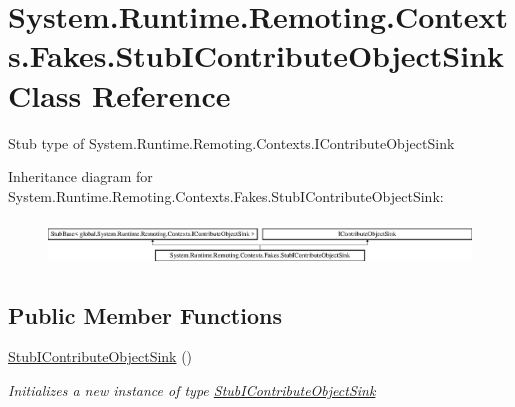 \hypertarget{class_system_1_1_runtime_1_1_remoting_1_1_contexts_1_1_fakes_1_1_stub_i_contribute_object_sink}{\section{System.\-Runtime.\-Remoting.\-Contexts.\-Fakes.\-Stub\-I\-Contribute\-Object\-Sink Class Reference}
\label{class_system_1_1_runtime_1_1_remoting_1_1_contexts_1_1_fakes_1_1_stub_i_contribute_object_sink}
}


Stub type of System.\-Runtime.\-Remoting.\-Contexts.\-I\-Contribute\-Object\-Sink 


Inheritance diagram for System.\-Runtime.\-Remoting.\-Contexts.\-Fakes.\-Stub\-I\-Contribute\-Object\-Sink\-:\begin{figure}[H]
\begin{center}
\leavevmode
\includegraphics[height=1.228070cm]{class_system_1_1_runtime_1_1_remoting_1_1_contexts_1_1_fakes_1_1_stub_i_contribute_object_sink}
\end{center}
\end{figure}
\subsection*{Public Member Functions}
\begin{DoxyCompactItemize}
\item 
\hyperlink{class_system_1_1_runtime_1_1_remoting_1_1_contexts_1_1_fakes_1_1_stub_i_contribute_object_sink_ad3a66d9c52e4a69862b07c504d9606b4}{Stub\-I\-Contribute\-Object\-Sink} ()
\begin{DoxyCompactList}\small\item\em Initializes a new instance of type \hyperlink{class_system_1_1_runtime_1_1_remoting_1_1_contexts_1_1_fakes_1_1_stub_i_contribute_object_sink}{Stub\-I\-Contribute\-Object\-Sink}\end{DoxyCompactList}\end{DoxyCompactItemize}
